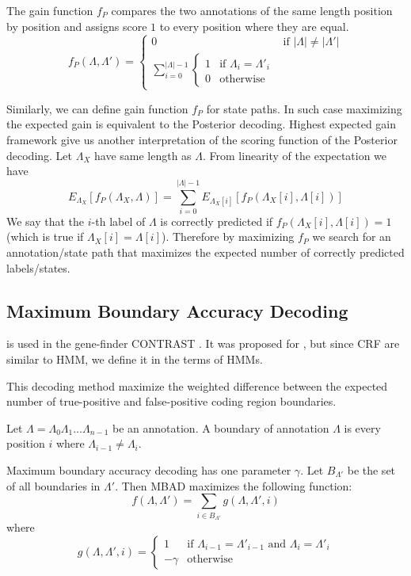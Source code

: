 The gain function $f_P$ compares the two annotations of the same length position
by position and assigns score $1$ to every position where they are equal.
\begin{equation}
f_P(\Lambda,\Lambda') = 
\begin{cases}
0 & \text{if $|\Lambda|\not=|\Lambda'|$}\\
\sum_{i=0}^{|\Lambda|-1}\begin{cases}
1 & \text{if $\Lambda_i=\Lambda'_i$}\\
0 & \text{otherwise}
\end{cases}
\end{cases}
\end{equation}

Similarly, we can define gain function $f_P$ for state paths. In such case
maximizing the expected gain is equivalent to the Posterior decoding. Highest
expected gain framework give us another interpretation of the scoring function of
the Posterior decoding. Let $\Lambda_X$  have same length as $\Lambda$. From
linearity of the expectation we have \[E_{\Lambda_X}[f_P(\Lambda_X,\Lambda)] =
\sum_{i=0}^{|\Lambda|-1}E_{\Lambda_X[i]}[f_P(\Lambda_X[i],\Lambda[i])]\] We say
that the $i$-th label of $\Lambda$ is correctly predicted if
$f_P(\Lambda_X[i],\Lambda[i])=1$ (which is true if $\Lambda_X[i]=\Lambda[i]$). Therefore  by maximizing $f_P$ we search for
an annotation/state path that maximizes the expected number of correctly
predicted labels/states.

\subsection{Maximum Boundary Accuracy Decoding}

 is used in the gene-finder
CONTRAST \cite{Gross2007}. It
was proposed for , but since CRF
are similar to HMM, we define it in the terms of HMMs.

This decoding method  maximize the weighted difference between the expected
number of true-positive and false-positive coding region boundaries.

\begin{definition}
Let $\Lambda=\Lambda_0\Lambda_1\dots\Lambda_{n-1}$ be an annotation. A boundary of
annotation $\Lambda$ is every position $i$ where $\Lambda_{i-1}\not=\Lambda_i$. 
\end{definition}

Maximum boundary accuracy decoding has one parameter $\gamma$. Let $B_{\Lambda'}$ be the
set of all boundaries in $\Lambda'$. Then MBAD maximizes the following function:
\begin{equation}
f(\Lambda,\Lambda')=\sum_{i\in B_{\Lambda'}}g(\Lambda,\Lambda',i)
\end{equation}
where 
\begin{equation}
g(\Lambda,\Lambda',i)=
\begin{cases}
1 & \text{if $\Lambda_{i-1}=\Lambda'_{i-1}$ and $\Lambda_{i}=\Lambda'_{i}$}\\
-\gamma& \text{otherwise}
\end{cases}
\end{equation}

